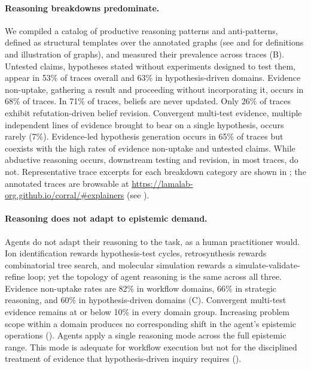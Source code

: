 \paragraph{Reasoning breakdowns predominate.}
We compiled a catalog of productive reasoning patterns and anti-patterns, defined as structural templates over the annotated graphs (see  and  for definitions and illustration of graphs), and measured their prevalence across traces (B). 
Untested claims, hypotheses stated without experiments designed to test them, appear in 53\% of traces overall and 63\% in hypothesis-driven domains. Evidence non-uptake, gathering a result and proceeding without incorporating it, occurs in 68\% of traces. In 71\% of traces, beliefs are never updated. Only 26\% of traces exhibit refutation-driven belief revision. Convergent multi-test evidence, multiple independent lines of evidence brought to bear on a single hypothesis, occurs rarely (7\%). Evidence-led hypothesis generation occurs in 65\% of traces but coexists with the high rates of evidence non-uptake and untested claims. While abductive reasoning occurs, downstream testing and revision, in most traces, do not. Representative trace excerpts for each breakdown category are shown in ; the annotated traces are browsable at \url{https://lamalab-org.github.io/corral/#explainers} (see ).

\paragraph{Reasoning does not adapt to epistemic demand.}
Agents do not adapt their reasoning to the task, as a human practitioner would. Ion identification rewards hypothesis-test cycles, retrosynthesis rewards combinatorial tree search, and molecular simulation rewards a simulate-validate-refine loop; yet the topology of agent reasoning is the same across all three. Evidence non-uptake rates are 82\% in workflow domains, 66\% in strategic reasoning, and 60\% in hypothesis-driven domains (C). Convergent multi-test evidence remains at or below 10\% in every domain group. Increasing problem scope within a domain produces no corresponding shift in the agent's epistemic operations (). Agents apply a single reasoning mode across the full epistemic range. This mode is adequate for workflow execution but not for the disciplined treatment of evidence that hypothesis-driven inquiry requires ().

